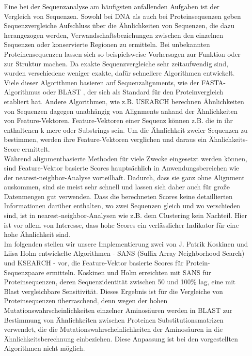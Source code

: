 \documentclass{article}
\begin{document}
Eine bei der Sequenzanalyse am häufigsten anfallenden Aufgaben ist der Vergleich
von Sequenzen. 
Sowohl bei DNA als auch bei Proteinsequenzen geben Sequenzvergleiche Aufschluss über die Ähnlichkeiten von Sequenzen, die dazu herangezogen werden, Verwandschaftsbeziehungen zwischen den einzelnen Sequenzen oder konservierte Regionen zu ermitteln. Bei unbekannten Proteinensequenzen lassen sich so beispielsweise Vorhersagen zur Funktion oder zur Struktur machen. Da exakte Sequenzvergleiche sehr zeitaufwendig sind, wurden verschiedene weniger exakte, dafür schnellere Algorithmen entwickelt.\\
Viele dieser Algorithmen basieren auf Sequenzalignments, wie der FASTA-Algorithmus \cite{FASTA} oder BLAST \cite{BLAST}, der sich als Standard für den Proteinvergleich etabliert hat.
Andere Algorithmen, wie z.B. USEARCH \cite{USEARCH} berechnen Ähnlichkeiten von Sequenzen dagegen unabhängig von Alignments anhand der Ähnlichkeiten von Feature-Vektoren. 
Feature-Vektoren einer Sequenz können z.B. die in ihr enthaltenen k-mere oder Substrings sein. 
Um die Ähnlichkeit zweier Sequenzen zu bestimmen, werden ihre Feature-Vektoren verglichen und daraus ein Ähnlichkeits-Score ermittelt.\\
Während alignmentbasierte Methoden für viele Zwecke eingesetzt werden können, sind Feature-Vektor basierte Scores hauptsächlich in Anwendungsbereichen wie der nearest-neighbor-Analyse vorteilhaft. 
Dadurch, dass sie ganz ohne Alignment auskommen, sind sie meist sehr schnell und lassen sich daher auch für große Datenmengen gut verwenden. 
Dass die berechneten Scores keine detaillierten Informationen darüber enthalten,
wo zwei Sequenzen gleich und wo verschieden sind, ist in nearest-neighbor-Analysen wie z.B. dem Clustering kein Nachteil. 
Hier ist vor allem von Interesse, dass hohe Scores ein verlässlicher Indikator für eine hohe Ähnlichkeit sind.\\
Im folgenden stellen wir unsere Implementierung zwei von J. Patrik Koskinen und Liisa Holm entwickelte Algorithmen - SANS (Suffix Array Neighborhood Search) und KSEARCH - vor, die Feature-Vektor basierte Scores für Protein-Sequenzpaare ermitteln. Koskinen und Holm erreichten mit SANS für Proteinsequenzen, deren Sequenzidentität zwischen 50 und 100\% lag, eine mit Blast vergleichbare Sensitivität. Dieses Ergebnis ist für die Vergleiche von Proteinsequenzen überraschend, denn wegen der hohen Mutationswahrscheinlichkeiten einzelner Aminosäuren werden in BLAST zur Bestimmung von Ähnlichkeiten zwischen Proteinen Substitutionsmatrizen verwendet, die die Mutationswahrscheinlichkeiten der Aminosäuren in die Ähnlichkeitsberechnung einbeziehen. 
Diese Anpassung ist bei den vorgestellten Algorithmen nicht möglich.
\end{document}
